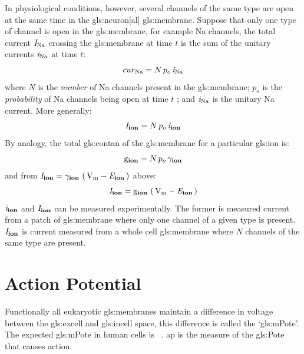 \documentclass[class={myRUCProject}, crop=false]{standalone}
\begin{document}
In physiological conditions, however, several channels of the same type are open at the same time in the \gls{gls:neuron}[al] \gls{gls:membrane}. Suppose that only one type of channel is open in the \gls{gls:membrane}, for example \gls{Na} channels, the total current \(\mathit{I}_\mathrm{Na}\) crossing the \gls{gls:membrane} at time \(t\) is the sum of the unitary currents \(\mathit{i}_\mathrm{Na}\) at time \(t\):
\begin{equation}
  cur_\mathrm{Na} = N \, p_o \, \mathit{i}_\mathrm{Na}
\end{equation}
where \(N\) is the \emph{number} of \gls{Na} channels present in the \gls{gls:membrane}; \(p_o\) is the \emph{probability} of \gls{Na} channels being open at time \(t\)
; and \(\mathit{i}_\mathrm{Na}\) is the unitary \gls{Na} current. \newline
More generally:
\begin{equation}
  \mathit{I}_\mathbf{ion}= N \, p_o \, \mathit{i}_\mathbf{ion}
\end{equation}
By analogy, the total \gls{gls:contan} of the \gls{gls:membrane} for a particular \gls{gls:ion} is: 
\begin{equation}
  \unit{\con\ion} = N \, p_o \, \uncon\ion
\end{equation}
and from \(\cur\ion= \uncon\ion \, \br{\unit{\V\membrane} - \equilibria\ion}\) above: 
\begin{equation}\label{eq:ionCurrent}
  \cur\ion= \unit{\con\ion} \, \br{\unit{\V\membrane} - \equilibria\ion}
\end{equation}
\(\mathit{i}_\mathbf{ion}\) and \(\mathit{I}_\mathbf{ion}\) can be measured experimentally. The former is measured current from a patch of \gls{gls:membrane} where only one channel of a given type is present. \(\mathit{I}_\mathbf{ion}\) is current measured from a whole cell \gls{gls:membrane} where \(N\) channels of the same type are present. 
 
\section{Action Potential}

Functionally all eukaryotic \glspl{gls:membrane} maintain a difference in voltage between the \gls{gls:excell} and \gls{gls:incell} space, this difference is called the `\gls{gls:mPote}'. The expected \gls{gls:mPote} in human cells is ~\cite{}.
\gls{ap} is the measure of the \gls{gls:Pote} that causes action.
\end{document}
